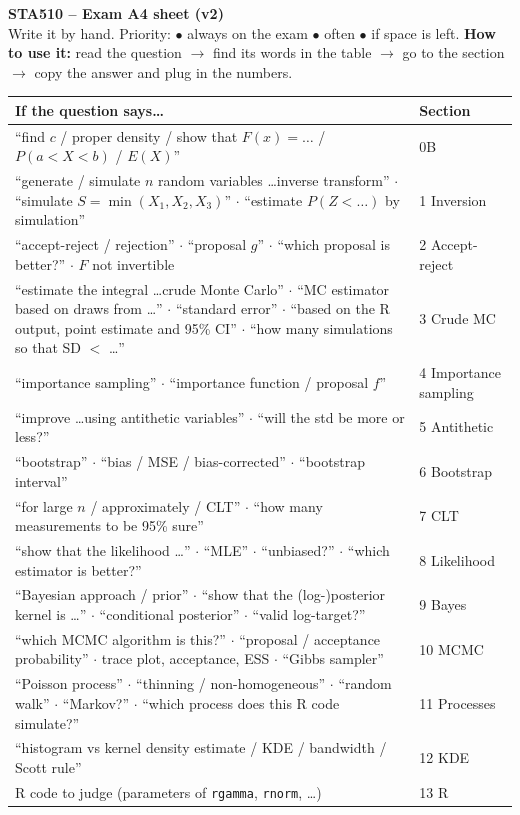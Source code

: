 \documentclass[10pt]{article}
\newcommand{\R}[1]{\texttt{#1}}
\newcommand{\always}{\textcolor{always}{$\bullet$}}
\newcommand{\often}{\textcolor{often}{$\bullet$}}
\newcommand{\spare}{\textcolor{spare}{$\bullet$}}
\begin{document}
{\LARGE\bfseries STA510 -- Exam A4 sheet (v2)}\\[2pt]
{\small Write it by hand. Priority: \always{} always on the exam \quad \often{} often \quad \spare{} if space is left.
\textbf{How to use it:} read the question $\to$ find its words in the table $\to$ go to the section $\to$ copy the answer and plug in the numbers.}

\vspace{4pt}
{\small
\begin{tabularx}{\textwidth}{@{}X l@{}}
\toprule
If the question says\dots & Section \\
\midrule
``find $c$ / proper density / show that $F(x)=\dots$ / $P(a<X<b)$ / $E(X)$'' & 0B \\
``generate / simulate $n$ random variables \dots inverse transform'' $\cdot$ ``simulate $S=\min(X_1,X_2,X_3)$'' $\cdot$ ``estimate $P(Z<\dots)$ by simulation'' & 1 Inversion \\
``accept-reject / rejection'' $\cdot$ ``proposal $g$'' $\cdot$ ``which proposal is better?'' $\cdot$ $F$ not invertible & 2 Accept-reject \\
``estimate the integral \dots crude Monte Carlo'' $\cdot$ ``MC estimator based on draws from \dots'' $\cdot$ ``standard error'' $\cdot$ ``based on the R output, point estimate and 95\% CI'' $\cdot$ ``how many simulations so that SD $<$ \dots'' & 3 Crude MC \\
``importance sampling'' $\cdot$ ``importance function / proposal $f$'' & 4 Importance sampling \\
``improve \dots using antithetic variables'' $\cdot$ ``will the std be more or less?'' & 5 Antithetic \\
``bootstrap'' $\cdot$ ``bias / MSE / bias-corrected'' $\cdot$ ``bootstrap interval'' & 6 Bootstrap \\
``for large $n$ / approximately / CLT'' $\cdot$ ``how many measurements to be 95\% sure'' & 7 CLT \\
``show that the likelihood \dots'' $\cdot$ ``MLE'' $\cdot$ ``unbiased?'' $\cdot$ ``which estimator is better?'' & 8 Likelihood \\
``Bayesian approach / prior'' $\cdot$ ``show that the (log-)posterior kernel is \dots'' $\cdot$ ``conditional posterior'' $\cdot$ ``valid log-target?'' & 9 Bayes \\
``which MCMC algorithm is this?'' $\cdot$ ``proposal / acceptance probability'' $\cdot$ trace plot, acceptance, ESS $\cdot$ ``Gibbs sampler'' & 10 MCMC \\
``Poisson process'' $\cdot$ ``thinning / non-homogeneous'' $\cdot$ ``random walk'' $\cdot$ ``Markov?'' $\cdot$ ``which process does this R code simulate?'' & 11 Processes \\
``histogram vs kernel density estimate / KDE / bandwidth / Scott rule'' & 12 KDE \\
R code to judge (parameters of \R{rgamma}, \R{rnorm}, \dots) & 13 R \\
\bottomrule
\end{tabularx}}
\end{document}

